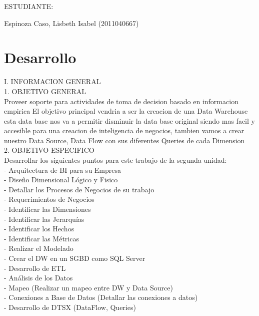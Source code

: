 \documentclass[12pt,letterpaper]{article}
\begin{document}
\begin{titlepage}
\begin{center}
\vspace*{0.2in}
\vspace*{0.1in}
\begin{large}
ESTUDIANTE: \\
\begin{flushleft}

Espinoza Caso, Lisbeth Isabel 		\hfill	(2011040667) \\

\end{flushleft}
\end{large}
\end{center}

\end{titlepage}

 \newpage

\section{Desarrollo} 
I.	INFORMACION GENERAL\\

1.	OBJETIVO GENERAL\\
Proveer soporte para actividades de toma de decision basado en informacion empirica El objetivo principal vendria a ser la creacion de una Data Warehouse esta data base nos va a permitir disminuir la data base original siendo mas facil y accesible para una creacion de inteligencia de negocios, tambien vamos a crear nuestro Data Source, Data Flow con sus diferentes Queries de cada Dimension\\

2.	OBJETIVO ESPECIFICO\\
Desarrollar los siguientes puntos para este trabajo de la segunda unidad:\\

- Arquitectura de BI para su Empresa\\
- Dise\~no Dimensional L\'ogico y Fisico\\
- Detallar los Procesos de Negocios de su trabajo\\
- Requerimientos de Negocios\\
- Identificar las Dimensiones\\
- Identificar las Jerarqu\'ias\\
- Identificar los Hechos\\
- Identificar las M\'etricas\\
- Realizar el Modelado\\
- Crear el DW en un SGBD como SQL Server\\
- Desarrollo de ETL\\
- An\'alisis de los Datos\\
- Mapeo (Realizar un mapeo entre DW y Data Source)\\
- Conexiones a Base de Datos (Detallar las conexiones a datos)\\
- Desarrollo de DTSX (DataFlow, Queries)\\
\end{document}
